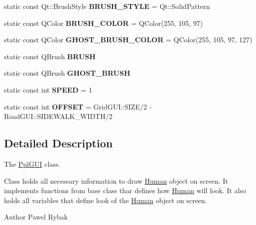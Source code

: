 \begin{DoxyCompactItemize}
\item 
\hypertarget{classPplGUI_a182d5e147d9dab40810270b6eee13e29}{static const Qt\-::\-Brush\-Style {\bfseries B\-R\-U\-S\-H\-\_\-\-S\-T\-Y\-L\-E} = Qt\-::\-Solid\-Pattern}\label{classPplGUI_a182d5e147d9dab40810270b6eee13e29}

\item 
\hypertarget{classPplGUI_a9a5acb61b9f5b566250ba23145e12eb8}{static const Q\-Color {\bfseries B\-R\-U\-S\-H\-\_\-\-C\-O\-L\-O\-R} = Q\-Color(255, 105, 97)}\label{classPplGUI_a9a5acb61b9f5b566250ba23145e12eb8}

\item 
\hypertarget{classPplGUI_a79c19c75f04e710dfe287988fd687d64}{static const Q\-Color {\bfseries G\-H\-O\-S\-T\-\_\-\-B\-R\-U\-S\-H\-\_\-\-C\-O\-L\-O\-R} = Q\-Color(255, 105, 97, 127)}\label{classPplGUI_a79c19c75f04e710dfe287988fd687d64}

\item 
\hypertarget{classPplGUI_a478a2211e66aedeb3dba7c8ed4f1d16f}{static const Q\-Brush {\bfseries B\-R\-U\-S\-H}}\label{classPplGUI_a478a2211e66aedeb3dba7c8ed4f1d16f}

\item 
\hypertarget{classPplGUI_a28b6b84e45eecb95a57fd6ccbb83dd32}{static const Q\-Brush {\bfseries G\-H\-O\-S\-T\-\_\-\-B\-R\-U\-S\-H}}\label{classPplGUI_a28b6b84e45eecb95a57fd6ccbb83dd32}

\item 
\hypertarget{classPplGUI_a9bea7d41fbb3a003d6b8e7350f3e3508}{static const int {\bfseries S\-P\-E\-E\-D} = 1}\label{classPplGUI_a9bea7d41fbb3a003d6b8e7350f3e3508}

\item 
\hypertarget{classPplGUI_aef4e28993788ca773cecd5aa091d2248}{static const int {\bfseries O\-F\-F\-S\-E\-T} = Grid\-G\-U\-I\-::\-S\-I\-Z\-E/2 -\/ Road\-G\-U\-I\-::\-S\-I\-D\-E\-W\-A\-L\-K\-\_\-\-W\-I\-D\-T\-H/2}\label{classPplGUI_aef4e28993788ca773cecd5aa091d2248}

\end{DoxyCompactItemize}


\subsection{Detailed Description}
The \hyperlink{classPplGUI}{Ppl\-G\-U\-I} class. 

Class holds all necessary information to draw \hyperlink{classHuman}{Human} object on screen. It implements functions from base class thar defines how \hyperlink{classHuman}{Human} will look. It also holds all variables that define look of the \hyperlink{classHuman}{Human} object on screen. \begin{DoxyAuthor}{Author}
Pawel Rybak 
\end{DoxyAuthor}



